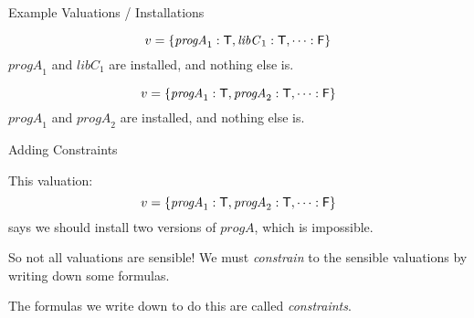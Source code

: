 \documentclass[xetex,aspectratio=169,14pt,hyperref={pdfpagelabels=true,pdflang={en-GB}}]{beamer}
\begin{document}
\begin{frame}
  {Example Valuations / Installations}

  \begin{displaymath}
    v = \{ \mathit{progA}_1 : \mathsf{T}, \mathit{libC}_1 : \mathsf{T}, \cdots : \mathsf{F} \}
  \end{displaymath}
  \raggedleft
  {\footnotesize $\mathit{progA}_1$ and $\mathit{libC}_1$ are
    installed, and nothing else is.}

  \raggedright

  \pause
  \begin{displaymath}
    v = \{ \mathit{progA}_1 : \mathsf{T}, \mathit{progA}_2 : \mathsf{T}, \cdots : \mathsf{F} \}
  \end{displaymath}
  \raggedleft
  {\footnotesize $\mathit{progA}_1$ and $\mathit{progA}_2$ are
    installed, and nothing else is.}

  \raggedright

\end{frame}

\begin{frame}
  {Adding Constraints}

  This valuation:
  \begin{displaymath}
    v = \{ \mathit{progA}_1 : \mathsf{T}, \mathit{progA}_2 : \mathsf{T}, \cdots : \mathsf{F} \}
  \end{displaymath}
  says we should install two versions of $\mathit{progA}$, which is
  impossible.

  \pause
  \bigskip

  So not all valuations are sensible! We must \emph{constrain} to the
  sensible valuations by writing down some formulas.

  \pause
  \bigskip

  The formulas we write down to do this are called \emph{constraints}.

\end{frame}
\end{document}
